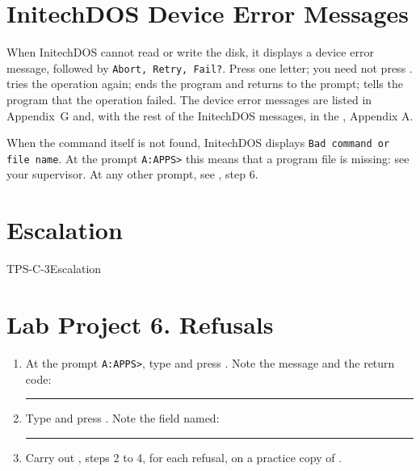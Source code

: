 \section{InitechDOS Device Error Messages}
When InitechDOS cannot read or write the disk, it displays a device error
message, followed by \texttt{Abort, Retry, Fail?}.  Press one letter; you need
not press .   tries the operation again;  ends the
program and returns to the prompt;  tells the program that the
operation failed.  The device error messages are listed in Appendix~G and,
with the rest of the InitechDOS messages, in the , Appendix A.

When the command itself is not found, InitechDOS displays \texttt{Bad command
or file name}.  At the prompt \texttt{A:\bs APPS>} this means that a program
file is missing: see your supervisor.  At any other prompt, see
, step 6.

\section{Escalation}
\begin{Checklist}{TPS-C-3}{Escalation}
\end{Checklist}

\section{Lab Project 6. Refusals}
\begin{enumerate}
\item At the prompt \texttt{A:\bs APPS>}, type  and press
  .  Note the message and the return code:\par
  \rule{40mm}{0.4pt}
\item Type  and press .  Note the field
  named: \rule{30mm}{0.4pt}
\item Carry out , steps 2 to 4, for each refusal, on a practice copy
  of .
\end{enumerate}


